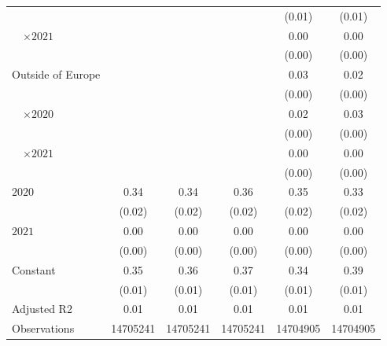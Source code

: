 \begin{tabular}{@{}l*{5}{S[table-format={-}2.2{\tnote{***}}]}@{}}
 &  &  &  & (0.01) & (0.01)\tabularnewline%
~~\(\times 2021\) &  &  &  & 0.00 & \vphantom{1} 0.00\tabularnewline%
 &  &  &  & (0.00) & \vphantom{3} (0.00)\tabularnewline%
Outside of Europe &  &  &  & 0.03\tnote{***} & 0.02\tnote{***}\tabularnewline%
 &  &  &  & (0.00) & \vphantom{2} (0.00)\tabularnewline%
~~\(\times 2020\) &  &  &  & 0.02\tnote{***} & 0.03\tnote{***}\tabularnewline%
 &  &  &  & (0.00) & \vphantom{1} (0.00)\tabularnewline%
~~\(\times 2021\) &  &  &  & 0.00 & 0.00\tabularnewline%
 &  &  &  & (0.00) & (0.00)\tabularnewline%
\midrule
\(2020\) & 0.34\tnote{***} & 0.34\tnote{***} & 0.36\tnote{***} & 0.35\tnote{***} & 0.33\tnote{***}\tabularnewline%
 & (0.02) & (0.02) & (0.02) & (0.02) & (0.02)\tabularnewline%
\(2021\) & 0.00 & 0.00 & 0.00 & 0.00 & 0.00\tabularnewline%
 & (0.00) & (0.00) & (0.00) & (0.00) & (0.00)\tabularnewline%
Constant & 0.35\tnote{***} & 0.36\tnote{***} & 0.37\tnote{***} & 0.34\tnote{***} & 0.39\tnote{***}\tabularnewline%
 & (0.01) & (0.01) & (0.01) & (0.01) & (0.01)\tabularnewline%
\midrule
Adjusted R2 & 0.01 & 0.01 & 0.01 & 0.01 & 0.01\tabularnewline%
Observations & {\num{14705241}} & {\num{14705241}} & {\num{14705241}} & {\num{14704905}} & {\num{14704905}}\tabularnewline%
\bottomrule
\end{tabular}
